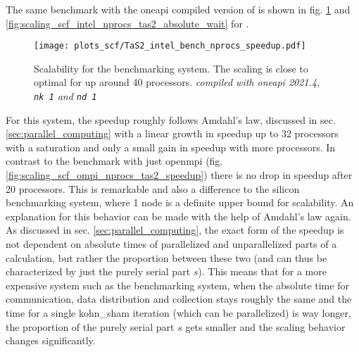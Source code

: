 \documentclass[main.tex]{subfiles}
\begin{document}
The same benchmark with the \gls{oneapi} compiled version of \QE is shown in fig. \ref{fig:scaling_scf_intel_nprocs_tas2_speedup} and \ref{fig:scaling_scf_intel_nprocs_tas2_absolute_wait} for \TaS.
\begin{figure}
    \centering
    \texttt{[image: plots\_scf/TaS2\_intel\_bench\_nprocs\_speedup.pdf]}
    \caption{Scalability for the \TaS benchmarking system. The scaling is close to optimal for up around 40 processors. \emph{ compiled with \gls{oneapi} 2021.4, \texttt{nk 1} and \texttt{nd 1}}}
    \label{fig:scaling_scf_intel_nprocs_tas2_speedup}
\end{figure}
For this system, the speedup roughly follows Amdahl's law, discussed in sec. \ref{sec:parallel_computing} with a linear growth in speedup up to 32 processors with a saturation and only a small gain in speedup with more processors.
In contrast to the benchmark with just \gls{openmpi} (fig. \ref{fig:scaling_scf_ompi_nprocs_tas2_speedup}) there is no drop in speedup after 20 processors.
This is remarkable and also a difference to the silicon benchmarking system, where 1 node is a definite upper bound for scalability.
An explanation for this behavior can be made with the help of Amdahl's law again.
As discussed in sec. \ref{sec:parallel_computing}, the exact form of the speedup is not dependent on absolute times of parallelized and unparallelized parts of a calculation, but rather the proportion between these two (and can thus be characterized by just the purely serial part \(s\)).
This means that for a more expensive system such as the \TaS benchmarking system, when the absolute time for communication, data distribution and collection stays roughly the same and the time for a single \gls{kohn_sham} iteration (which can be parallelized) is way longer, the proportion of the purely serial part \(s\) gets smaller and the scaling behavior changes significantly.
\end{document}
